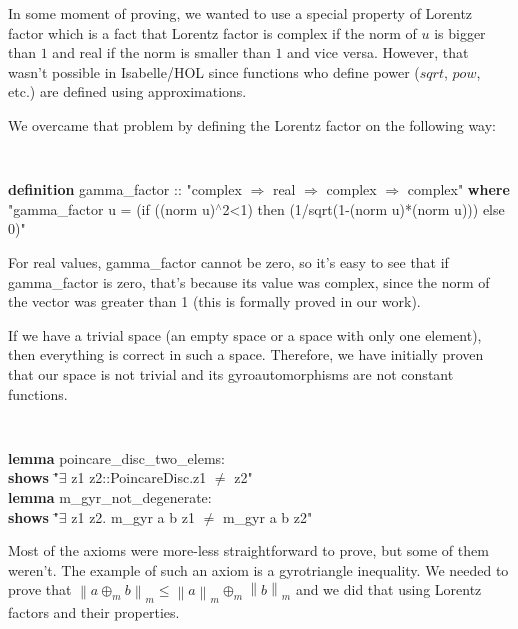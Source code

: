\documentclass[a4paper]{article}
\newcommand{\tab}{\hspace{5mm}}
\theoremstyle{definition}
\newcommand{\norm}[1]{\left\lVert#1\right\rVert}
\begin{document}
In some moment of proving, we wanted to use a special property of Lorentz factor which is a fact that Lorentz factor is complex if the norm of $u$ is bigger than $1$ and real if the norm is smaller than $1$ and vice versa. However, that wasn't possible in Isabelle/HOL since functions who define power ($sqrt$, $pow$, etc.) are defined using approximations.

We overcame that problem by defining the Lorentz factor on the following way:


{\tt
\begin{footnotesize}
\begin{tabbing}
{\bf definition} gamma\_factor :: "complex $\Rightarrow$ real  $\Rightarrow$ complex  $\Rightarrow$ complex" {\bf where}\\
\tab  "gamma\_factor u = (if ((norm u)$^\wedge$2<1) then (1/sqrt(1-(norm u)*(norm u))) else 0)"

\end{tabbing}
\end{footnotesize}
\tt}

For real values, gamma\_factor cannot be zero, so it's easy to see that if gamma\_factor is zero, that's because its value was complex, since the norm of the vector was greater than 1 (this is formally proved in our work).

If we have a trivial space (an empty space or a space with only one element), then everything is correct in such a space. Therefore, we have initially proven that our space is not trivial and its gyroautomorphisms are not constant functions.

{\tt
\begin{footnotesize}
\begin{tabbing}
{\bf lemma} poincare\_disc\_two\_elems:\\
{\bf shows} \="$\exists$ z1 z2::PoincareDisc.z1 $\neq$ z2"\\[1mm]
{\bf lemma} m\_gyr\_not\_degenerate:\\
{\bf shows} \="$\exists$ z1 z2. m\_gyr a b z1 $\neq$ m\_gyr a b z2"\\
\end{tabbing}
\end{footnotesize}
}

Most of the axioms were more-less straightforward to prove, but some of them weren't. The example of such an axiom is a gyrotriangle inequality. We needed to prove that $\norm{a\oplus_m b}_m \leq \norm{a}_m \oplus_m \norm{b}_m$ and we did that using Lorentz factors and their properties.
\end{document}
